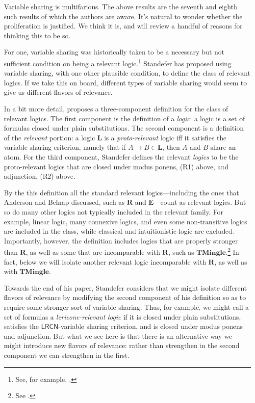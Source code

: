 \documentclass{amsart}
\theoremstyle{definition}
\newcommand{\LRCN}{\mathsf{LRCN}}
\newcommand{\logic}[1]{{\ensuremath {\mathbf{#1}}}}
\begin{document}
Variable sharing is multifarious. The above results are the seventh and eighth such results of which the authors are aware. It's natural to wonder whether the proliferation is justified. We think it is, and will review a handful of reasons for thinking this to be so.

For one, variable sharing was historically taken to be a necessary but not sufficient condition on being a relevant logic.\footnote{ See, for example, \citet{sep-logic-relevance}.} 
Standefer \citeyearpar{standefer2024} has proposed using variable sharing, with one other plausible condition, to define the class of relevant logics. If we take this on board, different types of variable sharing would seem to give us different flavors of relevance. 

In a bit more detail, \citet{standefer2024} proposes a three-component definition for the class of relevant logics. The first component is the definition of a \emph{logic}: a logic is a set of formulas closed under plain substitutions. The second component is a definition of the \emph{relevant} portion: a logic \logic{L} is a \emph{proto-relevant} logic iff it satisfies the variable sharing criterion, namely that if $A\to B\in\logic{L}$, then $A$ and $B$ share an atom. For the third component, Standefer defines the relevant \emph{logics} to be the proto-relevant logics that are closed under modus ponens, (R1) above, and adjunction, (R2) above.

By the this definition all the standard relevant logics---including the ones that Anderson and Belnap discussed, such as \logic{R} and \logic{E}---count as relevant logics. But so do many other logics not typically included in the relevant family. For example, linear logic, many connexive logics, and even some non-transitive logics are included in the class, while classical and intuitionistic logic are excluded. Importantly, however, the definition includes logics that are properly stronger than \logic{R}, as well as some that are incomparable with \logic{R}, such as \logic{TMingle}.\footnote{See \citet{Mendez2012-MNDTEP}.}
In fact, below we will isolate another relevant logic incomparable with \logic{R}, as well as with \logic{TMingle}.

Towards the end of his paper, Standefer considers that we might isolate different flavors of relevance by modifying the second component of his definition so as to require some stronger sort of variable sharing. Thus, for example, we might call a set of formulas a \emph{lericone-relevant logic} if it is closed under plain substitutions, satisfies the $\LRCN$-variable sharing criterion, and is closed under modus ponens and adjunction. But what we see here is that there is an alternative way we might introduce new flavors of relevance: rather than strengthen in the second component we can strengthen in the first. 
\end{document}
